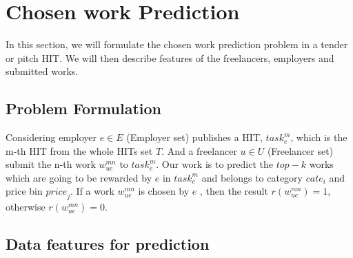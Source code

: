 \documentclass{sig-alternate-05-2015}
\begin{document}
\section{ Chosen work Prediction}
In this section, we will formulate the chosen work prediction problem in a tender or pitch HIT. We will then describe features of the freelancers, employers and submitted works.
\subsection{Problem Formulation}
Considering employer $e \in E$ (Employer set) publishes a HIT, ${task}_{e}^{m}$, which is the m-th HIT  from the  whole HITs set $T$. And a freelancer $u \in U$ (Freelancer set) submit the n-th work ${w}_{ue}^{mn}$ to ${task}_{e}^{m}$. Our work is to predict the $top-k$ works which are going to be rewarded by $e$ in ${task}_{e}^{m}$ and belongs to category ${cate}_{i}$ and price bin ${price}_{j}$. If a work ${w}_{ue}^{mn}$ is chosen by $e$ , then the result $r({w}_{ue}^{mn})=1$, otherwise $r({w}_{ue}^{mn})=0$.
\subsection{Data features for prediction}
\end{document}
